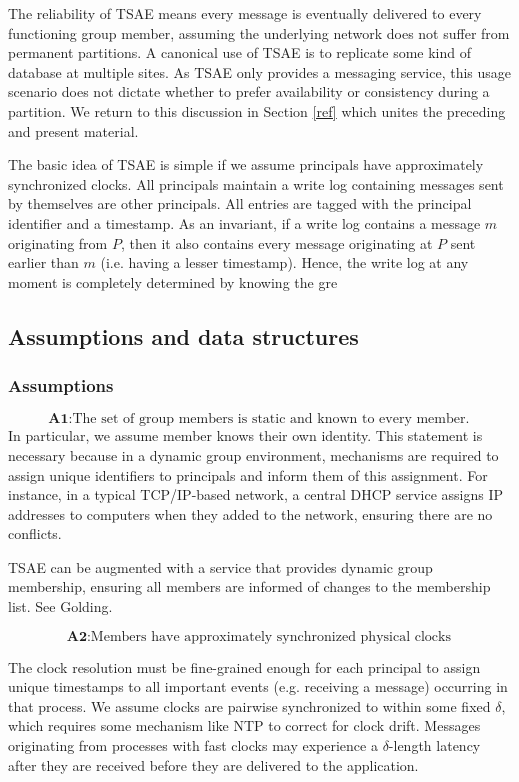 \documentclass[]             %
{NASA}                       %
\theoremstyle{definition}
\begin{document}

The reliability of TSAE means every message is eventually delivered to
every functioning group member, assuming the underlying network does
not suffer from permanent partitions. A canonical use of TSAE is to
replicate some kind of database at multiple sites. As TSAE only
provides a messaging service, this usage scenario does not dictate
whether to prefer availability or consistency during a partition. We
return to this discussion in Section \ref{ref} which unites the
preceding and present material.

The basic idea of TSAE is simple if we assume principals have
approximately synchronized clocks. All principals maintain a write log
containing messages sent by themselves are other principals. All
entries are tagged with the principal identifier and a timestamp. As
an invariant, if a write log contains a message $m$ originating from
$P$, then it also contains every message originating at $P$ sent
earlier than $m$ (i.e. having a lesser timestamp). Hence, the write
log at any moment is completely determined by knowing the gre


\subsection{Assumptions and data structures}

\subsubsection{Assumptions}

\[
  \textbf{A1}: \textrm{The set of group members is static and known to every member.}
\]
In particular, we assume member knows their own identity. This
statement is necessary because in a dynamic group environment,
mechanisms are required to assign unique identifiers to principals and
inform them of this assignment. For instance, in a typical
TCP/IP-based network, a central DHCP service assigns IP addresses to
computers when they added to the network, ensuring there are no
conflicts.

TSAE can be augmented with a service that provides dynamic group
membership, ensuring all members are informed of changes to the
membership list. See Golding.

\[
  \textbf{A2}: \textrm{Members have approximately synchronized physical clocks}
\]

The clock resolution must be fine-grained enough for each principal to
assign unique timestamps to all important events (e.g. receiving a
message) occurring in that process. We assume clocks are pairwise
synchronized to within some fixed $\delta$, which requires some
mechanism like NTP to correct for clock drift. Messages originating
from processes with fast clocks may experience a $\delta$-length
latency after they are received before they are delivered to the
application.
\end{document}

